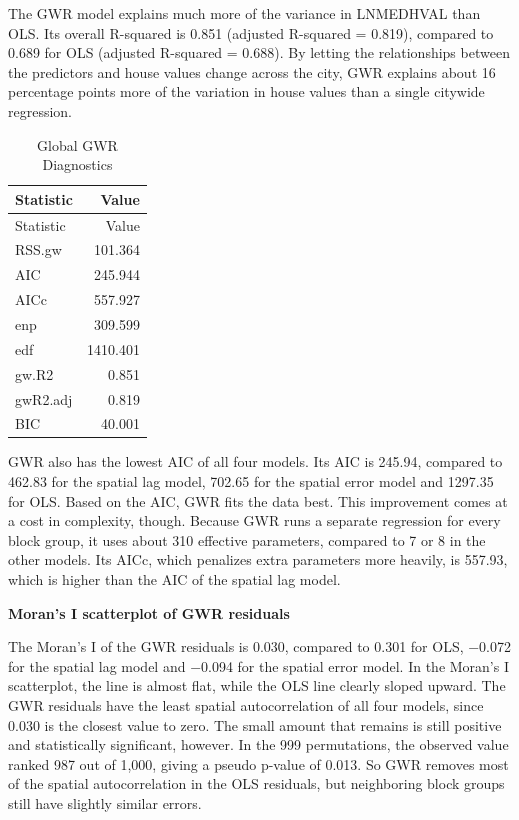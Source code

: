 \documentclass[
  12pt,
]{article}
\begin{document}
The GWR model explains much more of the variance in LNMEDHVAL than OLS.
Its overall R-squared is 0.851 (adjusted R-squared = 0.819), compared to
0.689 for OLS (adjusted R-squared = 0.688). By letting the relationships
between the predictors and house values change across the city, GWR
explains about 16 percentage points more of the variation in house
values than a single citywide regression.

\begin{longtable}[]{@{}lr@{}}
\caption{Global GWR Diagnostics}\tabularnewline
\toprule\noalign{}
Statistic & Value \\
\midrule\noalign{}
\endfirsthead
\toprule\noalign{}
Statistic & Value \\
\midrule\noalign{}
\endhead
\bottomrule\noalign{}
\endlastfoot
RSS.gw & 101.364 \\
AIC & 245.944 \\
AICc & 557.927 \\
enp & 309.599 \\
edf & 1410.401 \\
gw.R2 & 0.851 \\
gwR2.adj & 0.819 \\
BIC & 40.001 \\
\end{longtable}

GWR also has the lowest AIC of all four models. Its AIC is 245.94,
compared to 462.83 for the spatial lag model, 702.65 for the spatial
error model and 1297.35 for OLS. Based on the AIC, GWR fits the data
best. This improvement comes at a cost in complexity, though. Because
GWR runs a separate regression for every block group, it uses about 310
effective parameters, compared to 7 or 8 in the other models. Its AICc,
which penalizes extra parameters more heavily, is 557.93, which is
higher than the AIC of the spatial lag model.

\textbf{Moran's I scatterplot of GWR residuals}

The Moran's I of the GWR residuals is 0.030, compared to 0.301 for OLS,
−0.072 for the spatial lag model and −0.094 for the spatial error model.
In the Moran's I scatterplot, the line is almost flat, while the OLS
line clearly sloped upward. The GWR residuals have the least spatial
autocorrelation of all four models, since 0.030 is the closest value to
zero. The small amount that remains is still positive and statistically
significant, however. In the 999 permutations, the observed value ranked
987 out of 1,000, giving a pseudo p-value of 0.013. So GWR removes most
of the spatial autocorrelation in the OLS residuals, but neighboring
block groups still have slightly similar errors.
\end{document}
